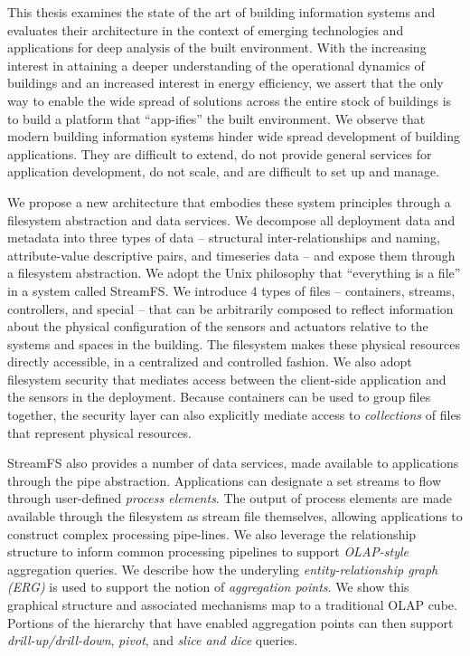 \documentclass{ucbthesis}
\begin{document}
This thesis examines the state of the art of building information systems and evaluates their architecture in the context
of emerging technologies and applications for deep analysis of the built environment.  With the increasing interest in
attaining a deeper understanding of the operational dynamics of buildings and an increased interest in energy efficiency,
we assert that the only way to enable the wide spread of solutions across the entire stock of buildings is to build a platform
that ``app-ifies'' the built environment.  We observe that modern building information systems hinder wide spread development 
of building applications.  They are difficult to extend, do not provide general services for application development, do not
scale, and are difficult to set up and manage.  

We propose a new architecture that embodies these system principles through a filesystem abstraction and data services.  We decompose
all deployment data and metadata into three types of data -- structural inter-relationships and naming, attribute-value descriptive pairs,
and timeseries data -- and expose them through a filesystem abstraction.  We adopt the Unix philosophy that ``everything is a file'' in a
system called StreamFS.  We introduce 4 types of files -- containers, streams, controllers, and special -- that can be arbitrarily
composed to reflect information about the physical configuration of the sensors and actuators relative to the systems and spaces in
the building.  The filesystem makes these physical resources directly accessible, in a centralized and controlled fashion.  We
also adopt filesystem security that mediates access between the client-side application and the sensors in the deployment.
Because containers can be used to group files together, the security layer can also explicitly mediate access to \emph{collections}
of files that represent physical resources.

StreamFS also provides a number of data services, made available to applications through the pipe abstraction.  Applications can 
designate a set streams to flow through user-defined \emph{process elements}.  The output of process elements are made available
through the filesystem as stream file themselves, allowing applications to construct complex processing pipe-lines.
We also leverage the relationship structure to inform common processing pipelines to support \emph{OLAP-style} aggregation
queries.  We describe how the underyling \emph{entity-relationship graph (ERG)} is used to support the notion of \emph{aggregation points}.
We show this graphical structure and associated mechanisms map to a traditional OLAP cube.  Portions of the hierarchy that have 
enabled aggregation points can then support \emph{drill-up/drill-down}, \emph{pivot}, and \emph{slice and dice} queries.
\end{document}
